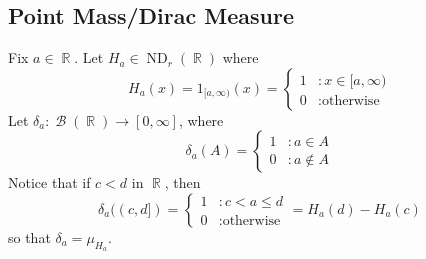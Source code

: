 \documentclass[11pt, a4paper]{memoir}
\DeclareMathOperator{\R}{{\mathbb{R}}}
\theoremstyle{change}
\theoremstyle{plain}
\theoremstyle{nonumberplain}
\DeclareMathOperator{\B}{{\mathcal{B}}}
\DeclareMathOperator{\ND}{ND}
\numberwithin{equation}{section}
\begin{document}
\subsection{Point Mass/Dirac Measure}
Fix $a\in\R$.
Let $H_a\in\ND_r(\R)$ where
\begin{equation*}
    H_a(x)=1_{[a,\infty)}(x)=\begin{cases}1&:x\in[a,\infty)\\0&:\text{otherwise}\end{cases}
\end{equation*}
Let $\delta_a:\B(\R)\to[0,\infty]$, where
\begin{equation*}
    \delta_a(A)=\begin{cases}1&:a\in A\\0&:a\notin A\end{cases}
\end{equation*}
Notice that if $c<d$ in $\R$, then
\begin{equation*}
    \delta_a((c,d])=\begin{cases}1 &:c<a\leq d\\0&:\text{otherwise}\end{cases}=H_a(d)-H_a(c) %
\end{equation*}
so that $\delta_a=\mu_{H_a}$.
\end{document}
